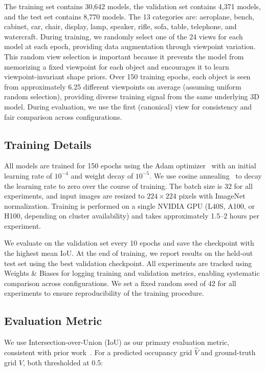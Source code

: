 \documentclass[10pt,twocolumn,letterpaper]{article}
\begin{document}
The training set contains 30,642 models, the validation set contains 4,371 models, and the test set contains 8,770 models. The 13 categories are: aeroplane, bench, cabinet, car, chair, display, lamp, speaker, rifle, sofa, table, telephone, and watercraft. During training, we randomly select one of the 24 views for each model at each epoch, providing data augmentation through viewpoint variation. This random view selection is important because it prevents the model from memorizing a fixed viewpoint for each object and encourages it to learn viewpoint-invariant shape priors. Over 150 training epochs, each object is seen from approximately 6.25 different viewpoints on average (assuming uniform random selection), providing diverse training signal from the same underlying 3D model. During evaluation, we use the first (canonical) view for consistency and fair comparison across configurations.

\subsection{Training Details}

All models are trained for 150 epochs using the Adam optimizer~\cite{kingma2014adam} with an initial learning rate of $10^{-4}$ and weight decay of $10^{-5}$. We use cosine annealing~\cite{loshchilov2016sgdr} to decay the learning rate to zero over the course of training. The batch size is 32 for all experiments, and input images are resized to $224 \times 224$ pixels with ImageNet normalization. Training is performed on a single NVIDIA GPU (L40S, A100, or H100, depending on cluster availability) and takes approximately 1.5--2 hours per experiment.

We evaluate on the validation set every 10 epochs and save the checkpoint with the highest mean IoU. At the end of training, we report results on the held-out test set using the best validation checkpoint. All experiments are tracked using Weights \& Biases for logging training and validation metrics, enabling systematic comparison across configurations. We set a fixed random seed of 42 for all experiments to ensure reproducibility of the training procedure.

\subsection{Evaluation Metric}

We use Intersection-over-Union (IoU) as our primary evaluation metric, consistent with prior work~\cite{choy2016r2n2,xie2019pix2vox}. For a predicted occupancy grid $\hat{V}$ and ground-truth grid $V$, both thresholded at 0.5:
\end{document}
